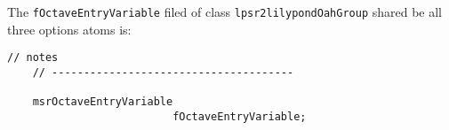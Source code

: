 The {\tt fOctaveEntryVariable} filed of class   {\tt lpsr2lilypondOahGroup} shared be all three options atoms is:
\begin{lstlisting}[language=CPlusPlus]
    // notes
    // --------------------------------------

    msrOctaveEntryVariable
                          fOctaveEntryVariable;
\end{lstlisting}


